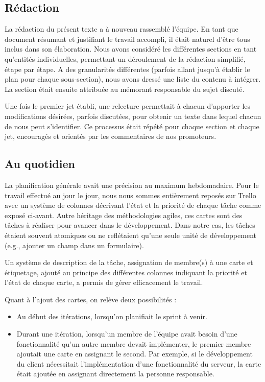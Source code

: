 \documentclass{EPL-master-thesis-covers-FR}
\begin{document}
			\subsection*{Rédaction}

				La rédaction du présent texte a à nouveau rassemblé l'équipe. En tant que document résumant et justifiant le travail accompli, il était naturel d'être tous inclus dans son élaboration. Nous avons considéré les différentes sections en tant qu'entités individuelles, permettant un déroulement de la rédaction simplifié, étape par étape. A des granularités différentes (parfois allant jusqu'à établir le plan pour chaque sous-section), nous avons dressé une liste du contenu à intégrer. La section était ensuite attribuée au mémorant responsable du sujet discuté.

				Une fois le premier jet établi, une relecture permettait à chacun d'apporter les modifications désirées, parfois discutées, pour obtenir un texte dans lequel chacun de nous peut s'identifier. Ce processus était répété pour chaque section et chaque jet, encouragés et orientés par les commentaires de nos promoteurs.

			\subsection*{Au quotidien}

				La planification générale avait une précision au maximum hebdomadaire. Pour le travail effectué au jour le jour, nous nous sommes entièrement reposés sur Trello avec un système de colonnes décrivant l'état et la priorité de chaque tâche comme exposé ci-avant. Autre héritage des méthodologies agiles, ces cartes sont des tâches à réaliser pour avancer dans le développement. Dans notre cas, les tâches étaient souvent atomiques ou ne reflétaient qu'une seule unité de développement (e.g., ajouter un champ dans un formulaire).

				Un système de description de la tâche, assignation de membre(s) à une carte et étiquetage, ajouté au principe des différentes colonnes indiquant la priorité et l'état de chaque carte, a permis de gérer efficacement le travail.

				Quant à l'ajout des cartes, on relève deux possibilités :
				\begin{itemize}
					\item Au début des itérations, lorsqu'on planifiait le sprint à venir.
					\item Durant une itération, lorsqu'un membre de l'équipe avait besoin d'une fonctionnalité qu'un autre membre devait implémenter, le premier membre ajoutait une carte en assignant le second. Par exemple, si le développement du client nécessitait l'implémentation d'une fonctionnalité du serveur, la carte était ajoutée en assignant directement la personne responsable.
				\end{itemize}
\end{document}
